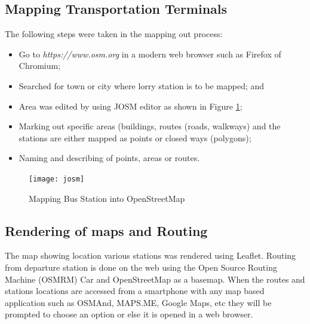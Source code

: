 \subsection{Mapping Transportation Terminals}
The following steps were taken in the mapping out process:
\begin{itemize}
	\item Go to \textit{https://www.osm.org} in a modern web browser such as Firefox of Chromium; 
	\item Searched for town or city where lorry station is to be mapped; and 
	\item Area was edited by using JOSM editor as shown in Figure \ref{fig:josm};
	\item Marking out specific areas (buildings, routes (roads, walkways) and the stations are either mapped as points or closed ways (polygons);  
	\item Naming  and describing of points, areas or routes. 
\end{itemize}

\begin{figure}[H]
	\centering
	\texttt{[image: josm]}
	\caption[Mapping Bus Station into OpenStreetMap]{Mapping Bus Station into OpenStreetMap}
	\label{fig:josm}
\end{figure}

\subsection{Rendering of maps and Routing}
The map showing location various stations was rendered using Leaflet. Routing from departure station is done on the web using the Open Source Routing Machine (OSMRM) Car and OpenStreetMap as a basemap. When the routes and stations locations are accessed from a smartphone with any map based application such as OSMAnd, MAPS.ME, Google Maps, etc they will be prompted to choose an option or else it is opened in a web browser.



